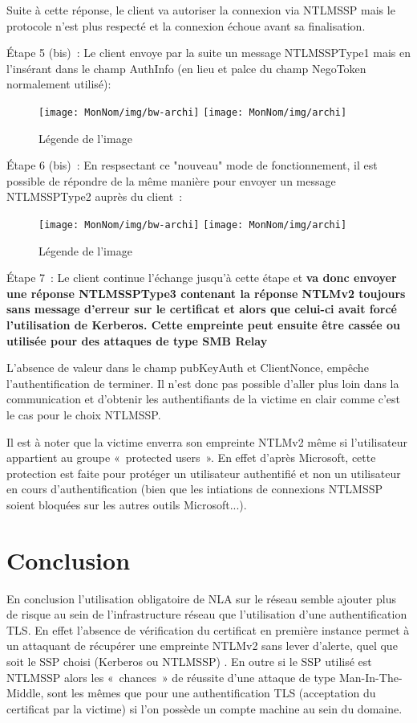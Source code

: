 Suite à cette réponse, le client va autoriser la connexion via NTLMSSP mais le protocole n'est plus respecté et la connexion échoue avant sa finalisation.

Étape 5 (bis) :
Le client envoye par la suite un message NTLMSSPType1 mais en l'insérant dans le champ AuthInfo (en lieu et palce du champ NegoToken normalement utilisé):

\begin{figure}[ht]
  \centering
  \ifssticbw
    \texttt{[image: MonNom/img/bw-archi]}
  \else
    \texttt{[image: MonNom/img/archi]}
  \fi
  \caption{Légende de l'image}
  \label{fig:monnom:archi}
\end{figure}

Étape 6 (bis) :
En respsectant ce "nouveau" mode de fonctionnement, il est possible de répondre de la même manière pour envoyer un message NTLMSSPType2 auprès du client :

\begin{figure}[ht]
  \centering
  \ifssticbw
    \texttt{[image: MonNom/img/bw-archi]}
  \else
    \texttt{[image: MonNom/img/archi]}
  \fi
  \caption{Légende de l'image}
  \label{fig:monnom:archi}
\end{figure}

Étape 7 :
Le client continue l'échange jusqu'à cette étape et \textbf{va donc envoyer une réponse NTLMSSPType3 contenant la réponse NTLMv2 toujours sans message d’erreur sur le certificat et alors que celui-ci avait forcé l’utilisation de Kerberos. Cette empreinte peut ensuite être cassée ou utilisée pour des attaques de type SMB Relay}

L’absence de valeur dans le champ pubKeyAuth et ClientNonce, empêche l’authentification de terminer. Il n’est donc pas possible d’aller plus loin dans la communication et d’obtenir les authentifiants de la victime en clair comme c’est le cas pour le choix NTLMSSP.

Il est à noter que la victime enverra son empreinte NTLMv2 même si l’utilisateur appartient au groupe « protected users ». En effet d’après Microsoft, cette protection est faite pour protéger un utilisateur authentifié et non un utilisateur en cours d’authentification (bien que les intiations de connexions NTLMSSP soient bloquées sur les autres outils Microsoft...).

\section{Conclusion}
En conclusion l’utilisation obligatoire de NLA sur le réseau semble ajouter plus de risque au sein de l’infrastructure réseau que l’utilisation d’une authentification TLS.
En effet l’absence de vérification du certificat en première instance permet à un attaquant de récupérer une empreinte NTLMv2 sans lever d’alerte, quel que soit le SSP choisi (Kerberos ou NTLMSSP) .
En outre si le SSP utilisé est NTLMSSP alors les « chances » de réussite d’une attaque de type Man-In-The-Middle, sont les mêmes que pour une authentification TLS (acceptation du certificat par la victime) si l’on possède un compte machine au sein du domaine.

